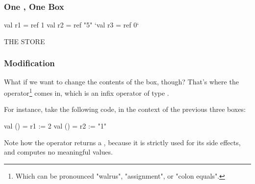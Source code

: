 \documentclass[aspectratio=169]{beamer}
\begin{document}
\begin{frame}[fragile]
  \frametitle{One , One Box}

  \begin{center}
    \begin{minipage}[t][2.5in][t]{0.55\textwidth}
      \vspace{\fill}
      \begin{codeblock}
        val r1 = ref 1
        val r2 = ref "5"
        `val r3 = ref 0`
      \end{codeblock}
      \vspace{\fill}
    \end{minipage}
    \hfill\vline\hfill
    \begin{minipage}[t][2.5in][t]{0.35\textwidth}
      \centering
      {\hspace{-20pt}\color{gray} \large THE STORE}

      \vspace{\fill}
      \vspace{\fill}
    \end{minipage}
  \end{center}
\end{frame}

\begin{frame}[fragile]
  \frametitle{ Modification}

  What if we want to change the contents of the box, though? That's where the
  \code{:=} operator\footnote{Which can be pronounced "walrus", "assignment", or "colon equals".}
  comes in, which is an infix operator of type .

  \pause
  \vspace{\fill}

  For instance, take the following code, in the context of the previous three boxes:
  \begin{codeblock}
    val () = r1 := 2
    val () = r2 := "1"
  \end{codeblock}

  \pause
  \vspace{\fill}

  Note how the \code{:=} operator returns a \code{()}, because it is strictly used
  for its side effects, and computes no meaningful values.
\end{frame}
\end{document}
